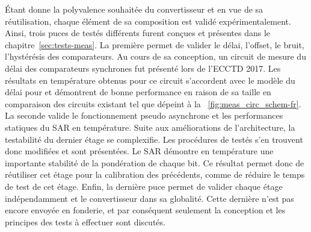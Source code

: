 \begin{mdframed}[linecolor=Prune,linewidth=1]
Étant donne la polyvalence souhaitée du convertisseur et en vue de sa réutilisation, chaque élément de sa composition est validé expérimentalement. Ainsi, trois puces de testés différents furent conçues et présentes dans le chapitre~\ref{sec:tests-meas}. La première permet de valider le délai, l'offset, le bruit, l’hystérésis des comparateurs. Au cours de sa conception, un circuit de mesure du délai des comparateurs synchrones fut présenté lors de l'ECCTD 2017. Les résultats en température obtenus pour ce circuit s'accordent avec le modèle du délai pour et démontrent de bonne performance en raison de sa taille en comparaison des circuits existant tel que dépeint à la \figurename~\ref{fig:meas_circ_schem-fr}. La seconde valide le fonctionnement pseudo asynchrone et les performances statiques du SAR en température. Suite aux améliorations de l'architecture, la testabilité du dernier étage se complexifie. Les procédures de testés s'en trouvent donc modifiées et sont présentées. Le SAR démontre en température une importante stabilité de la pondération de chaque bit. Ce résultat permet donc de réutiliser cet étage pour la calibration des précédents, comme de réduire le temps de test de cet étage. Enfin, la dernière puce permet de valider chaque étage indépendamment et le convertisseur dans sa globalité. Cette dernière n'est pas encore envoyée en fonderie, et par conséquent seulement la conception et les principes des tests à effectuer sont discutés.


\end{mdframed}
